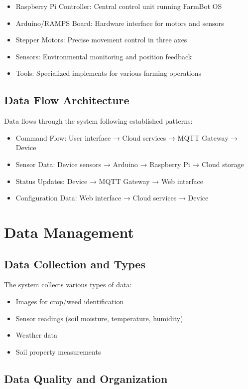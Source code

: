 \begin{itemize}
    \item Raspberry Pi Controller: Central control unit running FarmBot OS
    \item Arduino/RAMPS Board: Hardware interface for motors and sensors
    \item Stepper Motors: Precise movement control in three axes
    \item Sensors: Environmental monitoring and position feedback
    \item Tools: Specialized implements for various farming operations
\end{itemize}

\subsection{Data Flow Architecture}
Data flows through the system following established patterns:

\begin{itemize}
    \item Command Flow: User interface → Cloud services → MQTT Gateway → Device
    \item Sensor Data: Device sensors → Arduino → Raspberry Pi → Cloud storage
    \item Status Updates: Device → MQTT Gateway → Web interface
    \item Configuration Data: Web interface → Cloud services → Device
\end{itemize}

\section{Data Management}

\subsection{Data Collection and Types}

The system collects various types of data:
\begin{itemize}
\item Images for crop/weed identification
\item Sensor readings (soil moisture, temperature, humidity)
\item Weather data
\item Soil property measurements
\end{itemize}

\subsection{Data Quality and Organization}

